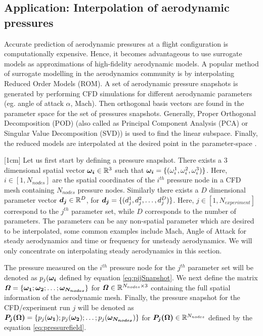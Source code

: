 \subsection{Application: Interpolation of aerodynamic pressures}\label{subecInterpolationOfAerodynamicPressures}
Accurate prediction of aerodynamic pressures at a flight configuration is computationally expensive. Hence, it becomes advantageous to use surrogate models as approximations of high-fidelity aerodynamic models. A popular method of surrogate modelling in the aerodynamics community is by interpolating Reduced Order Models (ROM). A set of aerodynamic pressure snapshots is generated by performing CFD simulations for different aerodynamic parameters (eg. angle of attack $\alpha$, Mach). Then orthogonal basis vectors are found in the parameter space for the set of pressures snapshots. Generally, Proper Orthogonal Decomposition (POD) \cite{tan2003proper, rosenbaum2013efficient, braconnier2011towards} (also called as Principal Component Analysis (PCA) or Singular Value Decomposition (SVD)) is used to find the linear subspace. Finally, the reduced models are interpolated at the desired point in the parameter-space \cite{beckert2001multivariate, barrault2004empirical}. 

[1cm]
Let us first start by defining a pressure snapshot. There exists a \(3\) dimensional spatial vector \(\boldsymbol{\omega_{i}} \in  \mathbb{R}^{3}\) such that \(\boldsymbol{\omega_{i}} = \{(\omega_{i}^{1}, \omega_{i}^{2}, \omega_{i}^{3})\}\). Here, \(i \in [1,N_{nodes}] \) are the spatial coordinates of the \(i^{th}\) pressure node in a CFD mesh containing \(N_{nodes}\) pressure nodes. Similarly there exists a \(D\) dimensional parameter vector \(\boldsymbol{d_{j}} \in  \mathbb{R}^{D}\), for \(\boldsymbol{d_{j}} = \{(d_{j}^{1}, d_{j}^{2}, \ldots ,d_{j}^{D})\}\). Here,   \(j \in [1,N_{experiment}] \) correspond to the \(j^{th}\) parameter set, while $D$ corresponds to the number of parameters. The parameters can be any non-spatial parameter which are desired to be interpolated, some common examples include Mach, Angle of Attack for steady aerodynamics and time or frequency for unsteady aerodynamics. We will only concentrate on interpolating steady aerodynamics in this section.

The pressure measured on the \(i^{th}\) pressure node for the \(j^{th}\) parameter set will be denoted as \(p_{j}(\boldsymbol{\omega_{i}}\) defined by equation \ref{eq:pijSnapshot}. We next define the matrix \(\bm{\mathit{\Omega}} = \{\boldsymbol{\omega_{1}}; \boldsymbol{\omega_{2}}; \ldots ; \boldsymbol{\omega_{N_{nodes}}}\}\) for \(\bm{\mathit{\Omega}} \in \mathbb{R}^{N_{nodes} \times 3}\) containing the full spatial information of the aerodynamic mesh. Finally, the pressure snapshot for the CFD/experiment run \(j\) will be denoted as \(\boldsymbol{P_{j}(\Omega)} = \{p_{j}(\boldsymbol{\omega_{1}}); p_{j}(\boldsymbol{\omega_{2}}); \ldots ; p_{j}(\boldsymbol{\omega_{N_{nodes}}})\}\) for \(\boldsymbol{P_{j}(\Omega)} \in \mathbb{R}^{N_{nodes}}\) defined by the equation \ref{eq:pressurefield}.

